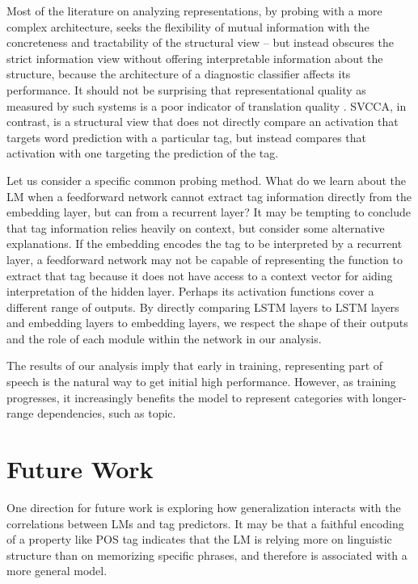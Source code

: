  Most of the literature on analyzing representations, by  probing with a  more complex architecture, seeks  the flexibility of mutual information  with the concreteness  and tractability of the structural view  --  but instead obscures the strict information view without offering interpretable information about the structure, because the architecture of a  diagnostic classifier affects its performance.  It should not be surprising that  representational quality as measured by such systems is   a poor indicator  of translation quality \cite{cifka2018bleu}. SVCCA, in contrast, is a structural view that  does not directly compare an activation  that targets word prediction with a particular tag, but instead compares that activation with one targeting the prediction of the tag. 

Let us consider a specific common probing method. What do we learn about the LM when a feedforward network cannot extract tag information directly from the embedding layer, but can from a recurrent layer? It may be tempting to conclude that tag information relies heavily on context, but consider some alternative explanations. If the embedding encodes the tag to be interpreted by a recurrent layer, a feedforward network may not be capable of representing the function to extract that tag because it does not have access to a context vector for aiding interpretation of the hidden layer. Perhaps its activation functions cover a different range of outputs. By directly comparing LSTM layers to LSTM layers and embedding layers to embedding layers, we respect the shape of their outputs and the role of each module within the network in our analysis. 

The results of our analysis imply that early in training, representing part of speech is the natural way to get initial high performance. However, as training progresses, it increasingly benefits the model to represent categories with longer-range dependencies, such as topic.

\section{Future Work}

One direction for future work is exploring how generalization interacts with the correlations between LMs and tag predictors. It may be that a faithful encoding of a property like POS tag indicates that the LM is relying more on linguistic structure than on memorizing specific phrases, and therefore is associated with a more general model. 

